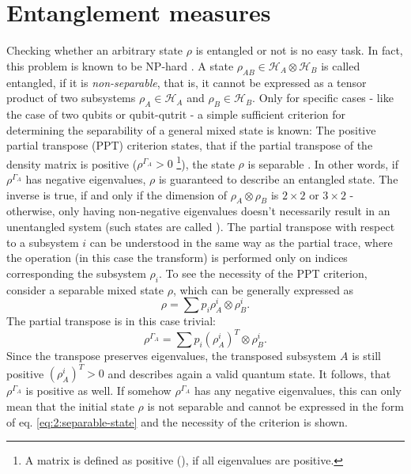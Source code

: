 \section{Entanglement measures}
Checking whether an arbitrary state $\rho$ is entangled or not is no easy task. In fact, this problem is known to be NP-hard \cite{Gurvits_2003}.
A state $\rho_{AB} \in \mathcal{H}_A\otimes\mathcal{H}_B$ is called entangled, if it is \emph{non-separable}, that is, it cannot be expressed as a tensor product of two subsystems $\rho_A \in \mathcal{H}_A$ and $\rho_B \in \mathcal{H}_B$.
Only for specific cases - like the case of two qubits or qubit-qutrit - a simple sufficient criterion for determining the separability of a general mixed state is known:
The positive partial transpose (PPT) criterion states, that if the partial transpose of the density matrix is positive ($\rho^{\Gamma_A} > 0$ \footnote{A matrix is defined as positive (), if all eigenvalues are positive.}), the state $\rho$ is separable \cite{Horodecki_2009,Plenio_2005a}. In other words, if $\rho^{\Gamma_A}$ has negative eigenvalues, $\rho$ is guaranteed to describe an entangled state.
The inverse is true, if and only if the dimension of $\rho_A\otimes\rho_B$ is $2\times2$ or $3\times2$ \cite{Horodecki_2009} - otherwise, only having non-negative eigenvalues doesn't necessarily result in an unentangled system (such states are called ).
The partial transpose with respect to a subsystem $i$ can be understood in the same way as the partial trace, where the operation (in this case the transform) is performed only on indices corresponding the subsystem $\rho_i$.
To see the necessity of the PPT criterion, consider a separable mixed state $\rho$, which can be generally expressed as 
\begin{equation}\label{eq:2:separable-state}
  \rho = \sum p_i \rho_{A}^i\otimes\rho_{B}^i .
\end{equation}
The partial transpose is in this case trivial:
\begin{equation}
  \rho^{\Gamma_A} = \sum p_i (\rho_{A}^i)^T \otimes \rho_{B}^i .
\end{equation}
Since the transpose preserves eigenvalues, the transposed subsystem $A$ is still positive $(\rho_{A}^i)^T > 0$ and describes again a valid quantum state. It follows, that $\rho^{\Gamma_A}$ is positive as well.
If somehow $\rho^{\Gamma_A}$ has any negative eigenvalues, this can only mean that the initial state $\rho$ is not separable and cannot be expressed in the form of eq. \eqref{eq:2:separable-state} and the necessity of the criterion is shown.

